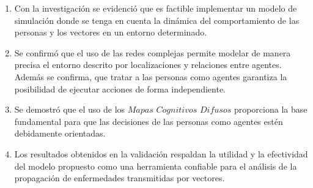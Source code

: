 \begin{conclusions}
    \begin{enumerate}
        \item Con la investigación se evidenció que es factible implementar un modelo de simulación donde se tenga en cuenta la dinámica del comportamiento de las personas y los vectores en un entorno determinado. 
        \item Se confirmó que el uso de las redes complejas permite modelar de manera precisa el entorno descrito por localizaciones y relaciones entre agentes. Además se confirma, que tratar a las personas como agentes garantiza la posibilidad de ejecutar acciones de forma independiente.
        \item Se demostró que el uso de los $Mapas$ $Cognitivos$ $Difusos$ proporciona la base fundamental para que las decisiones de las personas como agentes estén debidamente orientadas.
        \item Los resultados obtenidos en la validación respaldan la utilidad y la efectividad del modelo propuesto como una herramienta confiable para el análisis de la propagación de enfermedades transmitidas por vectores.
    \end{enumerate}
\end{conclusions}
